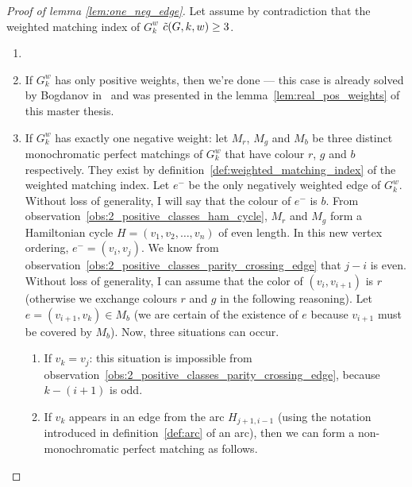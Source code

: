 \begin{proof}[Proof of lemma \ref{lem:one_neg_edge}]

    Let assume by contradiction that the weighted matching index of $G_k^w$ $\Tilde{c}(G, k, w) \geq 3$.

    \begin{enumerate}
        \item[]

        \item If $G_k^w$ has only positive weights, then we're done — this case is already solved by Bogdanov in~\cite{bogdanov} and was presented in the lemma~\ref{lem:real_pos_weights} of this master thesis.

        \item If $G_k^w$ has exactly one negative weight: let $M_r$, $M_g$ and $M_b$ be three distinct monochromatic perfect matchings of $G_k^w$ that have colour $r$, $g$ and $b$ respectively.
        They exist by definition~\ref{def:weighted_matching_index} of the weighted matching index.
        Let $e^-$ be the only negatively weighted edge of $G_k^w$.
        Without loss of generality, I will say that the colour of $e^-$ is $b$.
        From observation~\ref{obs:2_positive_classes_ham_cycle}, $M_r$ and $M_g$ form a Hamiltonian cycle $H = (v_1, v_2, \dots, v_n)$ of even length.
        In this new vertex ordering, $e^- = (v_i, v_j)$.
        We know from observation~\ref{obs:2_positive_classes_parity_crossing_edge} that $j-i$ is even.
        Without loss of generality, I can assume that the color of $(v_i, v_{i + 1})$ is $r$ (otherwise we exchange colours $r$ and $g$ in the following reasoning).
        Let $e = (v_{i + 1}, v_k) \in M_b$ (we are certain of the existence of $e$ because $v_{i+1}$ must be covered by $M_b$). Now, three situations can occur.

        \begin{enumerate}
            \item If $v_k = v_j$: this situation is impossible from observation~\ref{obs:2_positive_classes_parity_crossing_edge}, because $k - (i + 1)$ is odd.    %

            \item If $v_k$ appears in an edge from the arc $H_{j+1, i-1}$ (using the notation introduced in definition~\ref{def:arc} of an arc), then we can form a non-monochromatic perfect matching as follows.


\end{enumerate}
\end{enumerate}
\end{proof}
